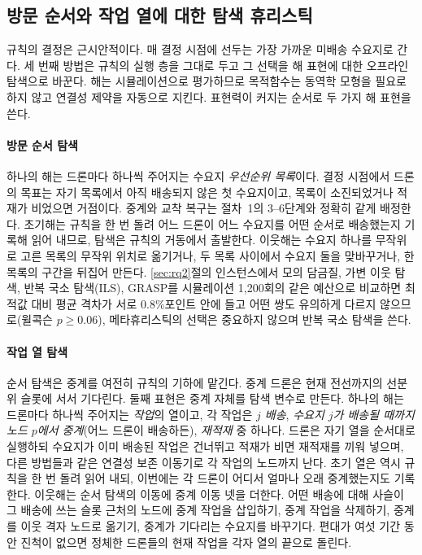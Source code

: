 \documentclass[final,5p,times,twocolumn]{elsarticle}
\begin{document}
\subsection{방문 순서와 작업 열에 대한 탐색 휴리스틱}
\label{sec:search}

규칙의 결정은 근시안적이다. 매 결정 시점에 선두는 가장 가까운 미배송 수요지로 간다. 세 번째
방법은 규칙의 실행 층을 그대로 두고 그 선택을 해 표현에 대한 오프라인 탐색으로 바꾼다. 해는
시뮬레이션으로 평가하므로 목적함수는 동역학 모형을 필요로 하지 않고 연결성 제약을 자동으로
지킨다. 표현력이 커지는 순서로 두 가지 해 표현을 쓴다.

\paragraph{방문 순서 탐색}
하나의 해는 드론마다 하나씩 주어지는 수요지 \emph{우선순위 목록}이다. 결정 시점에서 드론의
목표는 자기 목록에서 아직 배송되지 않은 첫 수요지이고, 목록이 소진되었거나 적재가 비었으면
거점이다. 중계와 교착 복구는 절차~1의 3--6단계와 정확히 같게 배정한다. 초기해는 규칙을 한 번
돌려 어느 드론이 어느 수요지를 어떤 순서로 배송했는지 기록해 읽어 내므로, 탐색은 규칙의 거동에서
출발한다. 이웃해는 수요지 하나를 무작위로 고른 목록의 무작위 위치로 옮기거나, 두 목록 사이에서
수요지 둘을 맞바꾸거나, 한 목록의 구간을 뒤집어 만든다. \ref{sec:rq2}절의 인스턴스에서 모의
담금질, 가변 이웃 탐색, 반복 국소 탐색(ILS), GRASP를 시뮬레이션 1{,}200회의 같은 예산으로
비교하면 최적값 대비 평균 격차가 서로 0.8\%포인트 안에 들고 어떤 쌍도 유의하게 다르지
않으므로(윌콕슨 $p \ge 0.06$), 메타휴리스틱의 선택은 중요하지 않으며 반복 국소 탐색을 쓴다.

\paragraph{작업 열 탐색}
순서 탐색은 중계를 여전히 규칙의 기하에 맡긴다. 중계 드론은 현재 전선까지의 선분 위 슬롯에 서서
기다린다. 둘째 표현은 중계 자체를 탐색 변수로 만든다. 하나의 해는 드론마다 하나씩 주어지는
\emph{작업}의 열이고, 각 작업은 \emph{$j$ 배송}, \emph{수요지 $j$가 배송될 때까지 노드 $p$에서
중계}(어느 드론이 배송하든), \emph{재적재} 중 하나다. 드론은 자기 열을 순서대로 실행하되
수요지가 이미 배송된 작업은 건너뛰고 적재가 비면 재적재를 끼워 넣으며, 다른 방법들과 같은
연결성 보존 이동기로 각 작업의 노드까지 난다. 초기 열은 역시 규칙을 한 번 돌려 읽어 내되, 이번에는
각 드론이 어디서 얼마나 오래 중계했는지도 기록한다. 이웃해는 순서 탐색의 이동에 중계 이동 넷을
더한다. 어떤 배송에 대해 사슬이 그 배송에 쓰는 슬롯 근처의 노드에 중계 작업을 삽입하기, 중계
작업을 삭제하기, 중계를 이웃 격자 노드로 옮기기, 중계가 기다리는 수요지를 바꾸기다. 편대가 여섯
기간 동안 진척이 없으면 정체한 드론들의 현재 작업을 각자 열의 끝으로 돌린다.
\end{document}
